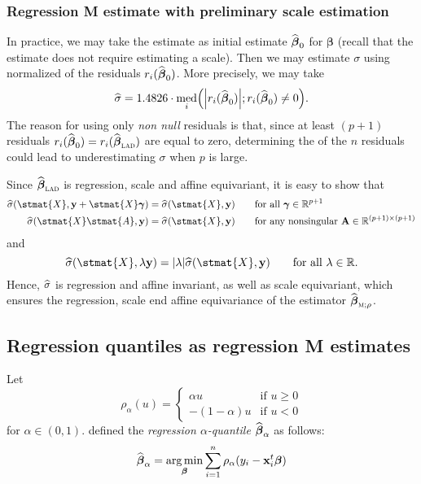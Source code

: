 \subsubsection{Regression M estimate with preliminary scale estimation}

In practice, we may take the  estimate as initial estimate
$\widehat{\boldsymbol\beta}_0$ for $\boldsymbol\beta$ (recall that the 
estimate does not require estimating a scale). Then we may estimate $\sigma$
using normalized  of the residuals
$r_{i}(\widehat{\boldsymbol\beta}_0)$. More precisely, we may take
\[
    \sthat{\sigma} = 1.4826 \cdot 
    \med_{i}\left(\left|r_{i}(\sthat{\boldsymbol\beta}_0)\right|; r_{i}(\sthat{\boldsymbol\beta}_0) \neq 0\right).
\]
The reason for using only \emph{non null} residuals is that, since at least
$(p+1)$ residuals $r_{i}(\sthat{\boldsymbol\beta}_0) =
r_{i}(\sthat{\boldsymbol\beta}_{\stsc{LAD}})$ are equal to zero, determining
the  of the $n$ residuals could lead to underestimating $\sigma$ when
$p$ is large.

Since $\sthat{\boldsymbol\beta}_{\stsc{LAD}}$ is regression, scale and
affine equivariant, it is easy to show that
%
\begin{align*}
    \sthat{\sigma}(\stmat{X}, \stvec{y} + \stmat{X}\boldsymbol\gamma)
        &= \sthat{\sigma}(\stmat{X}, \stvec{y})
        \qquad\text{for all $\boldsymbol\gamma \in \mathbb{R}^{p+1}$}\\
    \sthat{\sigma}(\stmat{X}\stmat{A}, \stvec{y})
        &= \sthat{\sigma}(\stmat{X}, \stvec{y})
        \qquad\text{for any nonsingular $\mathbf{A} \in \mathbb{R}^{(p+1)\times(p+1)}$}
\end{align*}
%
and
\[
    \sthat{\sigma}(\stmat{X}, \lambda\stvec{y}) 
    = |\lambda| \sthat{\sigma} (\stmat{X}, \stvec{y})
    \qquad\text{for all $\lambda\in\mathbb{R}$.}
\]
Hence, $\widehat{\sigma}$ is regression and affine invariant, as well as scale
equivariant, which ensures the regression, scale end affine equivariance of
the  estimator $\sthat{\boldsymbol\beta}_{\stsc{M};\rho}$.


\subsection{Regression quantiles as regression M estimates}

Let
\[
    \rho_{\alpha}(u)=
    \begin{cases}
        \alpha u     & \text{if $u\geq0$}\\
        -(1-\alpha)u & \text{if $u<0$}
    \end{cases}
\]
for $\alpha \in (0,1)$. \citet{Koenker:1978} defined the \emph{regression $\alpha$-quantile} 
$\widehat{\boldsymbol\beta}_{\alpha}$ as follows:
%
\begin{equation}\label{eq:quantile_regr_min}
    \widehat{\boldsymbol\beta}_{\alpha} 
    = \mathop{\arg\min}_{\boldsymbol\beta} \sum_{i=1}^{n} \rho_{\alpha}(y_{i}-\mathbf x_{i}^t\boldsymbol\beta)
\end{equation}

